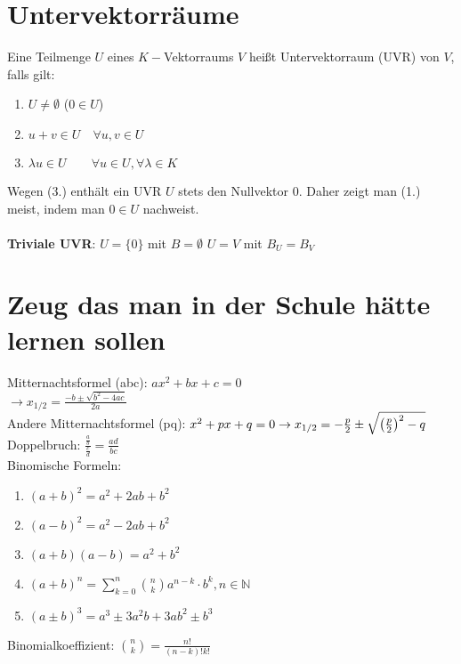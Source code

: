 \documentclass[6pt,a4paper]{scrartcl}
\newcommand{\N}{\ensuremath{\mathbb N}}
\newcommand{\enbrace}[1]{\ensuremath{\left(#1\right)}}
\begin{document}
\begin{multicols}{3}
\section{Untervektorräume}
Eine Teilmenge $U$ eines $K-$Vektorraums $V$ heißt Untervektorraum (UVR) von $V$, falls gilt:
\begin{enumerate}\itemsep0pt
	\item $U\neq \emptyset$ \qquad ($0\in U$)
	\item $u+v\in U \quad \forall u,v\in U$
	\item $\lambda u \in U \qquad \forall u\in U,\forall \lambda \in K$
\end{enumerate}
Wegen (3.) enthält ein UVR $U$ stets den Nullvektor $0$. Daher zeigt man (1.) meist, indem man $0\in U$ nachweist.\\
\\
\textbf{Triviale UVR}: $U=\{0\}$ mit $B = \emptyset$ \qquad $U=V$ mit $B_U=B_V$

\section{Zeug das man in der Schule hätte lernen sollen}
Mitternachtsformel (abc): $a x^2 + bx + c = 0$ \\
$\rightarrow x_{1/2} = \frac{-b \pm \sqrt{b^2 - 4ac}}{2a}$ \\
Andere Mitternachtsformel (pq): $x^2+p x+q=0 \\
\rightarrow x_{1/2} = -\frac{p}{2} \pm \sqrt{\enbrace{\frac{p}{2}}^2-q}$ \\
Doppelbruch: $\frac{\frac{a}{b}}{\frac{c}{d}}=\frac{a d}{b c}$ \\
Binomische Formeln:
\begin{enumerate}\itemsep-1pt
	\item $(a+b)^2=a^2+2ab+b^2$
	\item $(a-b)^2=a^2-2ab+b^2$
	\item $(a+b)(a-b)=a^2+b^2$
	\item $(a + b)^n = \sum_{k=0}^{n} \binom{n}{k} a^{n-k} \cdot b^k, n \in \N$
	\item $(a \pm b)^3 = a^3 \pm 3 a^2 b + 3 a b^2 \pm b^3$
\end{enumerate}
Binomialkoeffizient: $\binom{n}{k} = \frac{n!}{(n-k)! k!}$ \\


\end{multicols}
\end{document}
